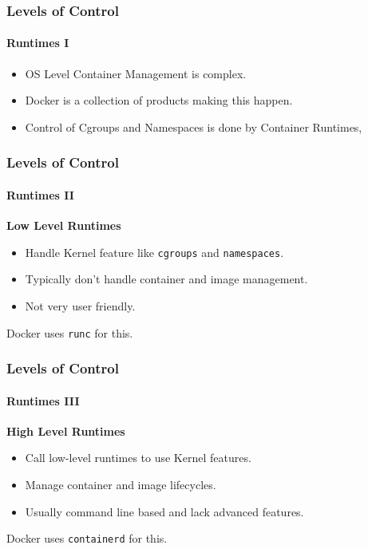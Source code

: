\begin{frame}
    \frametitle{Levels of Control}
    \framesubtitle{Runtimes I}
    \begin{itemize}
        \item OS Level Container Management is complex.
        \item Docker is a collection of products making this happen.
        \item Control of Cgroups and Namespaces is done by Container Runtimes,
    \end{itemize}
\end{frame}

\begin{frame}
    \frametitle{Levels of Control}
    \framesubtitle{Runtimes II}
    \textbf{Low Level Runtimes}\\
    \vspace{0.5cm}
    \begin{itemize}
        \item Handle Kernel feature like \texttt{cgroups} and \texttt{namespaces}.
        \item Typically don't handle container and image management.
        \item Not very user friendly.
    \end{itemize}
    \vspace{0.5cm}
    Docker uses \texttt{runc} for this.
\end{frame}

\begin{frame}
    \frametitle{Levels of Control}
    \framesubtitle{Runtimes III}
    \textbf{High Level Runtimes}\\
    \vspace{0.5cm}
    \begin{itemize}
        \item Call low-level runtimes to use Kernel features.
        \item Manage container and image lifecycles.
        \item Usually command line based and lack advanced features.
    \end{itemize}
    \vspace{0.5cm}
    Docker uses \texttt{containerd} for this.
\end{frame}

